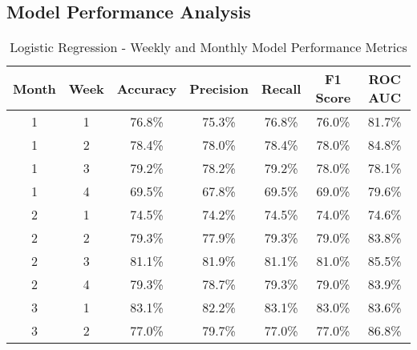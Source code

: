 		\subsection{Model Performance Analysis}
			\begin{table}[H]
				\centering
				\begin{tabular}{|c|c|c|c|c|c|c|}
					\hline
					\textbf{Month} & \textbf{Week} & \textbf{Accuracy} & \textbf{Precision} & \textbf{Recall}
					& \textbf{F1 Score}
					& \textbf{ROC AUC}
					\\ \hline
					1 & 1 & 76.8\% & 75.3\% & 76.8\% & 76.0\%
					& 81.7\% \\ \hline
					1 & 2 & 78.4\% & 78.0\% & 78.4\% & 78.0\%
					& 84.8\% \\ \hline
					1 & 3 & 79.2\% & 78.2\% & 79.2\% & 78.0\%
					& 78.1\% \\ \hline
					1 & 4 & 69.5\% & 67.8\% & 69.5\% & 69.0\%
					& 79.6\% \\ \hline
					2 & 1 & 74.5\% & 74.2\% & 74.5\% & 74.0\%
					& 74.6\% \\ \hline
					2 & 2 & 79.3\% & 77.9\% & 79.3\% & 79.0\%
					& 83.8\% \\ \hline
					2 & 3 & 81.1\% & 81.9\% & 81.1\% & 81.0\%
					& 85.5\% \\ \hline
					2 & 4 & 79.3\% & 78.7\% & 79.3\% & 79.0\%
					& 83.9\% \\ \hline
					3 & 1 & 83.1\% & 82.2\% & 83.1\% & 83.0\%
					& 83.6\% \\ \hline
					3 & 2 & 77.0\% & 79.7\% & 77.0\% & 77.0\%
					& 86.8\% \\ \hline
				\end{tabular}
				\caption{Logistic Regression - Weekly and Monthly Model Performance Metrics}
				\label{tab:weekly_monthly_performance_logistic_regression}
			\end{table}

